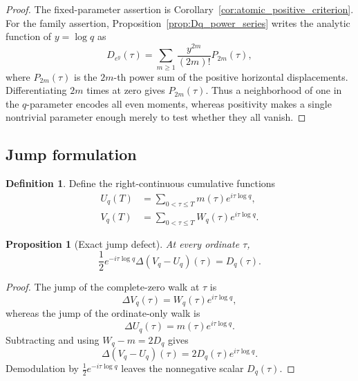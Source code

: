 \documentclass[11pt]{amsart}
\numberwithin{equation}{section}
\theoremstyle{plain}
\newtheorem{proposition}[theorem]{Proposition}
\theoremstyle{definition}
\newtheorem{definition}[theorem]{Definition}
\theoremstyle{remark}
\newcommand{\1}{\mathbf{1}}
\begin{document}
\begin{proof}
The fixed-parameter assertion is Corollary~\ref{cor:atomic_positive_criterion}.
For the family assertion, Proposition~\ref{prop:Dq_power_series} writes the
analytic function of \(y=\log q\) as
\begin{equation}
D_{e^y}(\tau)
=
\sum_{m\geq1}\frac{y^{2m}}{(2m)!}P_{2m}(\tau),
\label{eq:one_many_q_generating_function}
\end{equation}
where \(P_{2m}(\tau)\) is the \(2m\)-th power sum of the positive
horizontal displacements.  Differentiating \(2m\) times at zero gives
\(P_{2m}(\tau)\).  Thus a neighborhood of one in the \(q\)-parameter
encodes all even moments, whereas positivity makes a single nontrivial
parameter enough merely to test whether they all vanish.
\end{proof}

\subsection{Jump formulation}
\label{subsec:jump_formulation}

\begin{definition}
\label{def:cumulative_complete_walks}
Define the right-continuous cumulative functions
\begin{align}
U_q(T)
&=
\sum_{0<\tau\leq T}m(\tau)e^{i\tau\log q},
\label{eq:Uq_cumulative}
\\
V_q(T)
&=
\sum_{0<\tau\leq T}W_q(\tau)e^{i\tau\log q}.
\label{eq:Vq_cumulative}
\end{align}
\end{definition}

\begin{proposition}[Exact jump defect]
\label{prop:jump_defect}
At every ordinate $\tau$,
\begin{equation}
\boxed{
\frac12e^{-i\tau\log q}
\Delta(V_q-U_q)(\tau)
=
D_q(\tau).
}
\label{eq:jump_defect}
\end{equation}
\end{proposition}

\begin{proof}
The jump of the complete-zero walk at \(\tau\) is
\begin{equation}
\Delta V_q(\tau)
=
W_q(\tau)e^{i\tau\log q},
\label{eq:jump_complete_walk}
\end{equation}
whereas the jump of the ordinate-only walk is
\begin{equation}
\Delta U_q(\tau)
=
m(\tau)e^{i\tau\log q}.
\label{eq:jump_ordinate_walk}
\end{equation}
Subtracting and using \(W_q-m=2D_q\) gives
\begin{equation}
\Delta(V_q-U_q)(\tau)
=
2D_q(\tau)e^{i\tau\log q}.
\label{eq:jump_difference_detailed}
\end{equation}
Demodulation by \(\frac12e^{-i\tau\log q}\) leaves the nonnegative scalar
\(D_q(\tau)\).
\end{proof}
\end{document}
